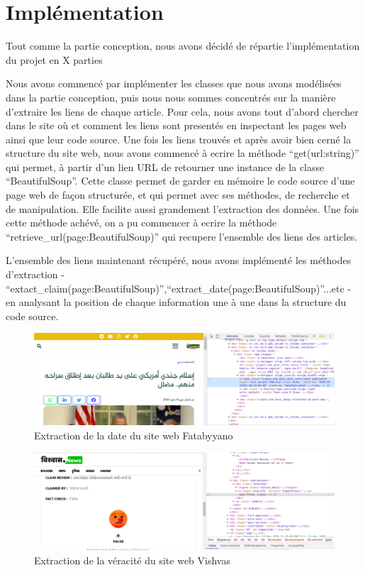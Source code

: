 \documentclass[oneside,13pt,a4paper]{report}
\begin{document}
\section{Implémentation}

Tout comme la partie conception, nous avons décidé de répartie l'implémentation du projet en X parties

Nous avons commencé par implémenter les classes que nous avons modélisées dans la partie conception, puis nous nous sommes concentrés sur la manière d'extraire les liens de chaque article. Pour cela, nous avons tout d'abord chercher dans le site où et comment les liens sont presentés en inspectant les pages web ainsi que leur code source. Une fois les liens trouvés et après avoir bien cerné la structure du site web, nous avons commencé à ecrire la méthode \enquote{get(url:string)} qui permet, à partir d'un lien URL de retourner une instance de la classe \enquote{BeautifulSoup}. Cette classe permet de garder en mémoire le code source d'une page web de façon structurée, et qui permet avec ses méthodes, de recherche et de manipulation. Elle facilite aussi grandement l'extraction des données. Une fois cette méthode achévé, on a pu commencer à ecrire la méthode \enquote{retrieve\_url(page:BeautifulSoup)} qui recupere l'ensemble des liens des articles.

L'ensemble des liens maintenant récupéré, nous avons implémenté les méthodes d'extraction - \enquote{extact\_claim(page:BeautifulSoup)},\enquote{extract\_date(page:BeautifulSoup)}...etc - en analysant la position de chaque information une à une dans la structure du code source.


\begin{figure}[h]
	\centering
	\begin{minipage}[c]{.95\linewidth}
		\includegraphics[width=1\textwidth]{img/fatab-screen.png}
		\caption{Extraction de la date du site web Fatabyyano}
	\end{minipage}
\end{figure}
\begin{figure}[h]
	\centering
	\begin{minipage}[c]{.95\linewidth}
		\includegraphics[width=1\textwidth]{img/vishvas-screen.png}
		\caption{Extraction de la véracité du site web Vishvas}
	\end{minipage}
\end{figure}
\end{document}
